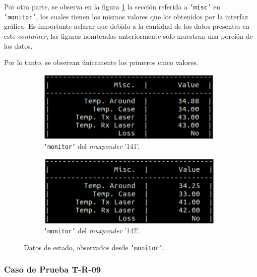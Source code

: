       Por otra parte, se observa en la figura \ref{fig:test8_2} la sección referida a \texttt{'misc'} en \texttt{'monitor'}, los cuales tienen los mismos valores que los obtenidos por la interfaz gráfica. Es importante aclarar que debido a la cantidad de los datos presentes en este \textit{container}, las figuras nombradas anteriormente solo muestran una porción de los datos.
      
      Por lo tanto, se observan únicamente los primeros cinco valores.

      \begin{figure}[H]
        \centering
        \begin{subfigure}[b]{0.45\textwidth}
            \centering
            \includegraphics[width=\textwidth]{Figures/test8_2_mux1.png}
            \caption{\texttt{'monitor'} del \textit{muxponder} '141'.}
        \end{subfigure}
        \quad
        \begin{subfigure}[b]{0.45\textwidth}  
            \centering 
            \includegraphics[width=\textwidth]{Figures/test8_2_mux2.png}
            \caption{\texttt{'monitor'} del \textit{muxponder} '142'.}
        \end{subfigure}
        \caption{Datos de estado, observados desde \texttt{'monitor'}.}
        \label{fig:test8_2}
    \end{figure}

      \subsubsection{Caso de Prueba T-R-09}

